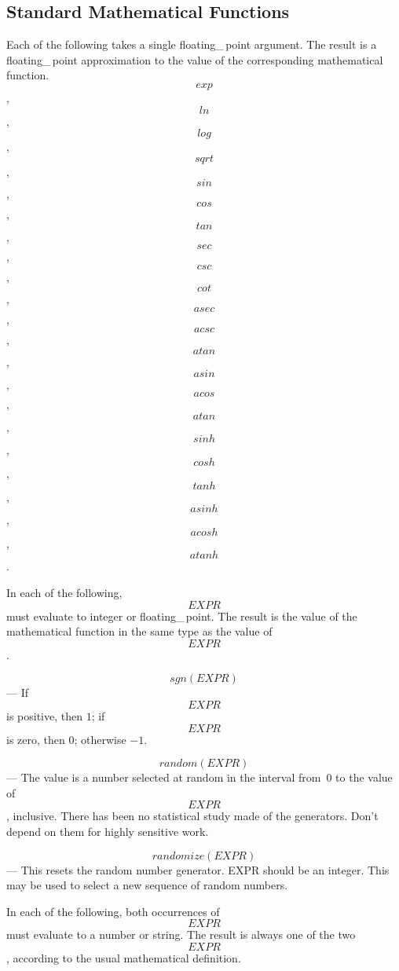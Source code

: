 {\pagebreak[0]
\subsection{Standard Mathematical Functions}

\begin{enumerate}
\item
Each of the following takes a  single floating\_\,point argument.
The result is a floating\_\,point approximation
to the value of the corresponding mathematical function.
\[exp\], \[ln\], \[log\], \[sqrt\], \[sin\], \[cos\], \[tan\],
\[sec\], \[csc\], \[cot\], \[asec\], \[acsc\], \[atan\],
\[asin\], \[acos\], \[atan\], \[sinh\], \[cosh\], \[tanh\],
\[asinh\], \[acosh\], \[atanh\].


\nopagebreak
\begin{sloppypar}
\item
In each of the following, \[EXPR\] must evaluate to 
integer or floating\_\,point.
The result is the value of the mathematical function in the
same type as the value of \[EXPR\]\@.
\end{sloppypar}

\begin{enumerate}
\item
\[sgn(EXPR)\] ---
If \[EXPR\] is positive, then \(1\); if \[EXPR\] is zero,
then \(0\); otherwise \(-1\).

\item
\[random(EXPR)\] ---
The value is a number selected at random in the interval
from~0 to the value of \[EXPR\], inclusive.
There has been no statistical study made of the generators.
Don't depend on them for highly sensitive work.

\begin{sloppypar}
\item
\[randomize(EXPR)\] ---
This resets the random number generator.
EXPR should be an integer.
This may be used to select a new sequence of random numbers.
\end{sloppypar}

\end{enumerate}


\item
In each of the following, both occurrences of \[EXPR\] 
must evaluate to a number or string.  
The result is always one of the two \[EXPR\],
according to the usual mathematical definition.


\end{enumerate}}
